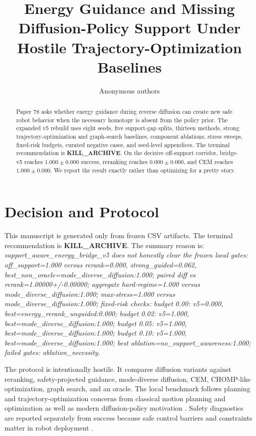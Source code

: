 \documentclass{article}
\title{Energy Guidance and Missing Diffusion-Policy Support Under Hostile Trajectory-Optimization Baselines}
\author{Anonymous authors}
\begin{document}
\maketitle

\begin{abstract}
Paper 78 asks whether energy guidance during reverse diffusion can create new safe robot behavior when the necessary homotopy is absent from the policy prior. The expanded v5 rebuild uses eight seeds, five support-gap splits, thirteen methods, strong trajectory-optimization and graph-search baselines, component ablations, stress sweeps, fixed-risk budgets, curated negative cases, and seed-level appendices. The terminal recommendation is \textbf{KILL\_ARCHIVE}. On the decisive off-support corridor, bridge-v5 reaches $1.000\pm0.000$ success, reranking reaches $0.000\pm0.000$, and CEM reaches $1.000\pm0.000$. We report the result exactly rather than optimizing for a pretty story.
\end{abstract}

\section{Decision and Protocol}
This manuscript is generated only from frozen CSV artifacts. The terminal recommendation is \textbf{KILL\_ARCHIVE}. The summary reason is: \emph{support\_aware\_energy\_bridge\_v5 does not honestly clear the frozen local gates: off\_support=1.000 versus rerank=0.000, strong\_guided=0.062, best\_non\_oracle=mode\_diverse\_diffusion:1.000; paired diff vs rerank=1.00000+/-0.00000; aggregate hard-regime=1.000 versus mode\_diverse\_diffusion:1.000; max-stress=1.000 versus mode\_diverse\_diffusion:1.000; fixed-risk checks: budget 0.00: v5=0.000, best=energy\_rerank\_unguided:0.000; budget 0.02: v5=1.000, best=mode\_diverse\_diffusion:1.000; budget 0.05: v5=1.000, best=mode\_diverse\_diffusion:1.000; budget 0.10: v5=1.000, best=mode\_diverse\_diffusion:1.000; best ablation=no\_support\_awareness:1.000; failed gates: ablation\_necessity.}

The protocol is intentionally hostile. It compares diffusion variants against reranking, safety-projected guidance, mode-diverse diffusion, CEM, CHOMP-like optimization, graph search, and an oracle. The local benchmark follows planning and trajectory-optimization concerns from classical motion planning and optimization \citep{lavalle2006planning,ratliff2009chomp,rubinstein1999cem} as well as modern diffusion-policy motivation \citep{ho2020ddpm,janner2022diffuser,chi2023diffusionpolicy}. Safety diagnostics are reported separately from success because safe control barriers and constraints matter in robot deployment \citep{ames2017cbf}.
\end{document}
